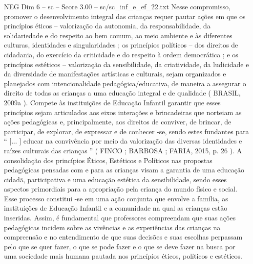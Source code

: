 \begin{textsample}{NEG Dim 6 – sc – Score 3.00 – sc/sc\_inf\_e\_ef\_22.txt}
Nesse compromisso, promover o desenvolvimento integral das crianças requer pautar ações em que os princípios éticos – valorização da autonomia, da responsabilidade, da solidariedade e do respeito ao bem comum, ao meio ambiente e às diferentes culturas, identidades e singularidades ; os princípios políticos – dos direitos de cidadania, do exercício da criticidade e do respeito à ordem democrática ; e os princípios estéticos – valorização da sensibilidade, da criatividade, da ludicidade e da diversidade de manifestações artísticas e culturais, sejam organizados e planejados com intencionalidade pedagógica/educativa, de maneira a assegurar o direito de todas as crianças a uma educação integral e de qualidade ( BRASIL, 2009a ).
Compete às instituições de Educação Infantil garantir que esses princípios sejam articulados aos eixos interações e brincadeiras que norteiam as ações pedagógicas e, principalmente, aos direitos de conviver, de brincar, de participar, de explorar, de expressar e de conhecer -se, sendo estes fundantes para “ [... ] educar na convivência por meio da valorização das diversas identidades e raízes culturais das crianças ” ( FINCO ; BARBOSA ; FARIA, 2015, p. 26 ).
A consolidação dos princípios Éticos, Estéticos e Políticos nas propostas pedagógicas pensadas com e para as crianças visam a garantia de uma educação cidadã, participativa e uma educação estética da sensibilidade, sendo esses aspectos primordiais para a apropriação pela criança do mundo físico e social.
Esse processo constitui -se em uma ação conjunta que envolve a família, as instituições de Educação Infantil e a comunidade na qual as crianças estão inseridas.
Assim, é fundamental que professores compreendam que suas ações pedagógicas incidem sobre as vivências e as experiências das crianças na compreensão e no entendimento de que suas decisões e suas escolhas perpassam pelo que se quer fazer, o que se pode fazer e o que se deve fazer na busca por uma sociedade mais humana pautada nos princípios éticos, políticos e estéticos.

\end{textsample}
